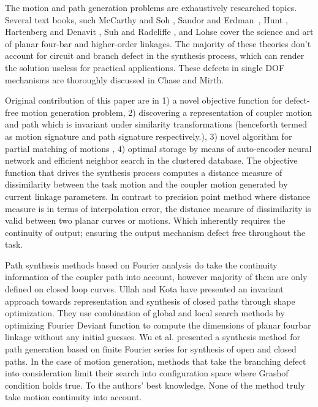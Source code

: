 \documentclass[twocolumn,10pt]{asme2e}
\begin{document}
The motion and path generation problems are exhaustively researched topics.
Several text books, such McCarthy and Soh \cite{sohmccarthy}, Sandor and Erdman~\cite{Sandor}, Hunt \cite{Hunt78}, Hartenberg and Denavit \cite{Hartenberg},  Suh and Radcliffe \cite{Suh78}, and Lohse \cite{lohse2013} cover the science and art of planar four-bar and higher-order linkages.
The majority of these theories don't account for circuit and branch defect in the synthesis process, which can render the solution useless for practical applications.
These defects in single DOF mechanisms are thoroughly discussed in Chase and Mirth\cite{chasemirth}.

Original contribution of this paper are in 1) a novel objective function for defect-free motion generation problem, 2) discovering a representation of coupler motion and path which is invariant under similarity transformations (henceforth termed as motion signature and path signature respectively.), 3) novel algorithm for partial matching of motions , 4) optimal storage by means of auto-encoder neural network and efficient neighbor search in the clustered database.
The objective function that drives the synthesis process computes a distance measure of dissimilarity between the task motion and the coupler motion generated by current linkage parameters.
In contrast to precision point method where distance measure is in terms of interpolation error, the distance measure of dissimilarity is valid between two planar curves or motions.
Which inherently requires the continuity of output; ensuring the output mechanism defect free throughout the task.


Path synthesis methods based on Fourier analysis do take the continuity information of the coupler path into account, however majority of them are only defined on closed loop curves.
Ullah and Kota\cite{ullah1997} have presented an invariant approach towards representation and synthesis of closed paths through shape optimization. They use combination of global and local search methods by optimizing Fourier Deviant function to compute the dimensions of planar fourbar linkage without any initial guesses.
Wu et al.\cite{wu2011} presented a synthesis method for path generation based on finite Fourier series for synthesis of open and closed paths.
In the case of motion generation, methods that take the branching defect into consideration limit their search into configuration space where Grashof condition holds true.
To the authors' best knowledge, None of the method truly take motion continuity into account.
\end{document}
